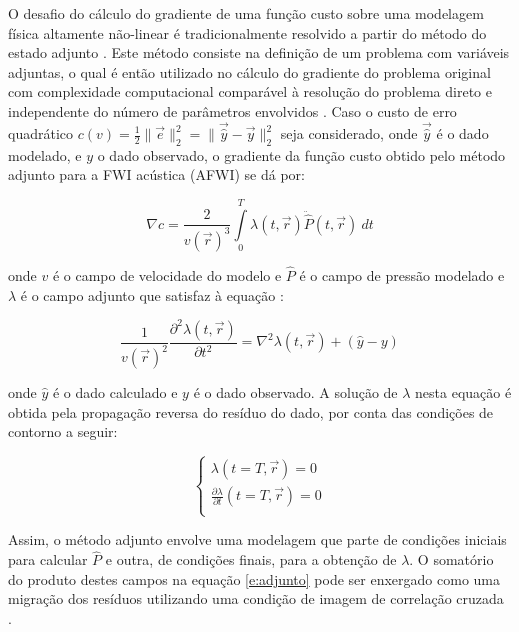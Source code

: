     O desafio do cálculo do gradiente de uma função custo sobre uma modelagem física altamente não-linear é tradicionalmente resolvido a partir do método do estado adjunto . Este método consiste na definição de um problema com variáveis adjuntas, o qual é então utilizado no cálculo do gradiente do problema original com complexidade computacional comparável à resolução do problema direto e independente do número de parâmetros envolvidos . Caso o custo de erro quadrático $c(v)=\frac{1}{2}\|\vec{e}\|_2^2=\|\vec{\hat{y}}-\vec{y} \|_2^2$ seja considerado, onde $\vec{\hat{y}}$ é o dado modelado, e $y$ o dado observado, o gradiente da função custo obtido pelo método adjunto para a FWI acústica (AFWI) se dá por:

    \begin{equation} \label{e:adjunto}
      \nabla c = \frac{2}{v(\vec{r})^3} \int \limits_0^{T} \lambda(t,\vec{r}) \ddot{\hat{P}}(t,\vec{r})\ dt
    \end{equation}

    \noindent onde $v$ é o campo de velocidade do modelo e $\hat{P}$ é o campo de pressão modelado e $\lambda$ é o campo adjunto que satisfaz à equação :

    \begin{equation} \label{e:adjunta}
      \frac{1}{v(\vec{r})^2} \frac{\partial^2 \lambda(t,\vec{r})}{\partial t^2} =
      \nabla^2 \lambda(t,\vec{r}) + (\hat{y} - y)
    \end{equation}

    \noindent onde $\hat{y}$ é o dado calculado e $y$ é o dado observado. A solução de $\lambda$ nesta equação é obtida pela propagação reversa do resíduo do dado, por conta das condições de contorno a seguir:

    \begin{equation} \label{e:adjunta_condicoes}
      \begin{cases}
        \lambda(t=T,\vec{r}) = 0\\
        \frac{\partial \lambda}{\partial t}(t=T,\vec{r}) = 0\\
      \end{cases}
    \end{equation}

    Assim, o método adjunto envolve uma modelagem que parte de condições iniciais para calcular $\hat{P}$ e outra, de condições finais, para a obtenção de $\lambda$. O somatório do produto destes campos na equação \ref{e:adjunto} pode ser enxergado como uma migração dos resíduos utilizando uma condição de imagem de correlação cruzada .


